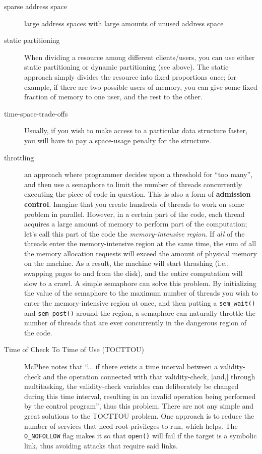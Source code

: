 \begin{description}
\item[sparse address space] large address spaces with large amounts of unused address space

\item[static partitioning] When dividing a resource among different clients/users, you can use either static partitioning or dynamic partitioning (see above). The static approach simply divides the resource into fixed proportions once; for example, if there are two possible users of memory, you can give some fixed fraction of memory to one user, and the rest to the other.


\item[time-space-trade-offs] Usually, if you wish to make access to a particular data structure faster, you will have to pay a space-usage penalty for the structure.

\item[throttling] an approach where programmer decides upon a threshold for ``too many'', and then use a semaphore to limit the number of threads concurrently executing the piece of code in question.  This is also a form of \textbf{admission control}. Imagine that you create hundreds of threads to work on some problem in parallel. However, in a certain part of the code, each thread acquires a large amount of memory to perform part of the computation; let’s call this part of the code the \emph{memory-intensive region}. If \emph{all} of the threads enter the memory-intensive region at the same time, the sum of all the memory allocation requests will exceed the amount of physical memory on the machine. As a result, the machine will start thrashing (i.e., swapping pages to and from the disk), and the entire computation will slow to a crawl.  A simple semaphore can solve this problem. By initializing the value of the semaphore to the maximum number of threads you wish to enter the memory-intensive region at once, and then putting a \texttt{sem\_wait()} and \texttt{sem\_post()} around the region, a semaphore can naturally throttle the number of threads that are ever concurrently in the dangerous region of the code.

\item[Time of Check To Time of Use (TOCTTOU)] McPhee notes that ``... if there exists a time interval between a validity-check and the operation connected with that validity-check, [and,] through multitasking, the validity-check variables can deliberately be changed during this time interval, resulting in an invalid operation being performed by the control program'', thus this problem.  There are not any simple and great solutions to the TOCTTOU problem. One approach is to reduce the number of services that need root privileges to run, which helps. The \texttt{O\_NOFOLLOW} flag makes it so that \texttt{open()} will fail if the target is a symbolic link, thus avoiding attacks that require said links.


\end{description}
